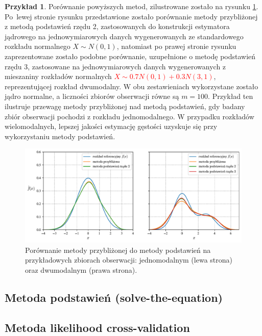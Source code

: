 \documentclass[12pt,a4paper,oneside]{book}
\theoremstyle{definition}
\newtheorem{exmp}{Przykład}[chapter]
\begin{document}
\begin{exmp}
Porównanie powyższych metod, zilustrowane zostało na rysunku \ref{fig:bandwidth_selection}. Po~lewej stronie rysunku przedstawione zostało porównanie metody przybliżonej z metodą podstawień rzędu 2, zastosowanych do konstrukcji estymatora jądrowego na jednowymiarowych danych wygenerowanych ze standardowego rozkładu normalnego $X \sim N(0,1)$, natomiast po prawej stronie rysunku zaprezentowane zostało podobne porównanie, uzupełnione o metodę podstawień rzędu 3, zastosowane na jednowymiarowych danych wygenerowanych z mieszaniny rozkładów normalnych \textcolor{red}{$X \sim 0.7 N(0,1) + 0.3 N(3,1)$}, reprezentującej rozkład dwumodalny. W obu zestawieniach wykorzystane zostało jądro normalne, a liczności zbiorów obserwacji równe są $m=100$. Przykład ten ilustruje przewagę metody przybliżonej nad metodą podstawień, gdy badany zbiór obserwacji pochodzi z rozkładu jednomodalnego. W przypadku rozkładów wielomodalnych, lepszej jakości estymację gęstości uzyskuje się przy wykorzystaniu metody podstawień.

\begin{figure}[H]
    \centering
    \includegraphics[scale=0.65]{bandwidth_selection}
    \caption{Porównanie metody przybliżonej do metody podstawień na przykładowych zbiorach obserwacji: jednomodalnym (lewa strona) oraz dwumodalnym (prawa strona).}
    \label{fig:bandwidth_selection}
\end{figure}
\end{exmp}

\subsection*{Metoda podstawień (solve-the-equation)}

\subsection*{Metoda likelihood cross-validation}
\end{document}
